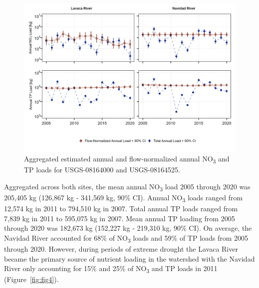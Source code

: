 \documentclass[sn-basic,referee,lineno,pdflatex]{sn-jnl}
\begin{document}
\begin{figure}

{\centering \includegraphics[width=1\linewidth,]{Schramm-2023-05-AS_files/figure-latex/fig3-1} 

}

\caption{Aggregated estimated annual and flow-normalized annual NO\textsubscript{3} and TP loads for USGS-08164000 and USGS-08164525.}\label{fig:fig3}
\end{figure}

Aggregated across both sites, the mean annual NO\textsubscript{3} load
2005 through 2020 was 205,405 kg (126,867 kg - 341,569 kg, 90\% CI).
Annual NO\textsubscript{3} loads ranged from 12,574 kg in 2011 to
794,510 kg in 2007. Total annual TP loads ranged from 7,839 kg in 2011
to 595,075 kg in 2007. Mean annual TP loading from 2005 through 2020 was
182,673 kg (152,227 kg - 219,310 kg, 90\% CI). On average, the Navidad
River accounted for 68\% of NO\textsubscript{3} loads and 59\% of TP
loads from 2005 through 2020. However, during periods of extreme drought
the Lavaca River became the primary source of nutrient loading in the
watershed with the Navidad River only accounting for 15\% and 25\% of
NO\textsubscript{3} and TP loads in 2011 (Figure~\ref{fig:fig4}).
\end{document}
